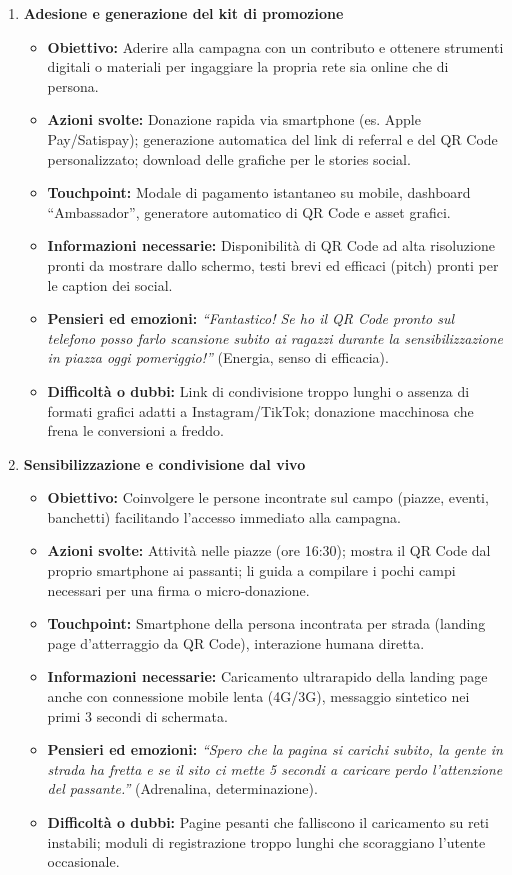 \documentclass[11pt,a4paper]{article}
\begin{document}
\begin{enumerate}
        \item \textbf{Adesione e generazione del kit di promozione}
        \begin{itemize}
            \item \textbf{Obiettivo:} Aderire alla campagna con un contributo e ottenere strumenti digitali o materiali per ingaggiare la propria rete sia online che di persona.
            \item \textbf{Azioni svolte:} Donazione rapida via smartphone (es. Apple Pay/Satispay); generazione automatica del link di referral e del QR Code personalizzato; download delle grafiche per le stories social.
            \item \textbf{Touchpoint:} Modale di pagamento istantaneo su mobile, dashboard ``Ambassador'', generatore automatico di QR Code e asset grafici.
            \item \textbf{Informazioni necessarie:} Disponibilità di QR Code ad alta risoluzione pronti da mostrare dallo schermo, testi brevi ed efficaci (pitch) pronti per le caption dei social.
            \item \textbf{Pensieri ed emozioni:} \textit{``Fantastico! Se ho il QR Code pronto sul telefono posso farlo scansione subito ai ragazzi durante la sensibilizzazione in piazza oggi pomeriggio!''} (Energia, senso di efficacia).
            \item \textbf{Difficoltà o dubbi:} Link di condivisione troppo lunghi o assenza di formati grafici adatti a Instagram/TikTok; donazione macchinosa che frena le conversioni a freddo.
        \end{itemize}

        \item \textbf{Sensibilizzazione e condivisione dal vivo}
        \begin{itemize}
            \item \textbf{Obiettivo:} Coinvolgere le persone incontrate sul campo (piazze, eventi, banchetti) facilitando l'accesso immediato alla campagna.
            \item \textbf{Azioni svolte:} Attività nelle piazze (ore 16:30); mostra il QR Code dal proprio smartphone ai passanti; li guida a compilare i pochi campi necessari per una firma o micro-donazione.
            \item \textbf{Touchpoint:} Smartphone della persona incontrata per strada (landing page d'atterraggio da QR Code), interazione humana diretta.
            \item \textbf{Informazioni necessarie:} Caricamento ultrarapido della landing page anche con connessione mobile lenta (4G/3G), messaggio sintetico nei primi 3 secondi di schermata.
            \item \textbf{Pensieri ed emozioni:} \textit{``Spero che la pagina si carichi subito, la gente in strada ha fretta e se il sito ci mette 5 secondi a caricare perdo l'attenzione del passante.''} (Adrenalina, determinazione).
            \item \textbf{Difficoltà o dubbi:} Pagine pesanti che falliscono il caricamento su reti instabili; moduli di registrazione troppo lunghi che scoraggiano l'utente occasionale.
        \end{itemize}


\end{enumerate}
\end{document}
